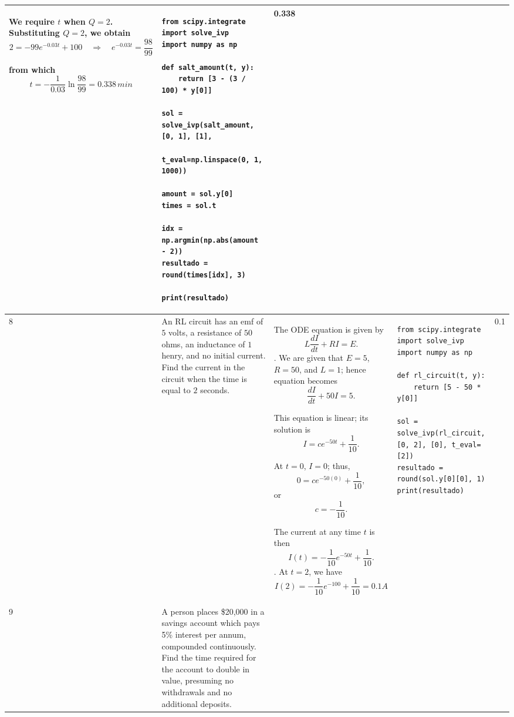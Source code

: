 \documentclass[a4paper,12pt]{article}
\begin{document}
\begin{longtable}{|p{0.3cm}|p{}|p{10cm}|p{}|p{1.5cm}|}
We require \( t \) when \( Q = 2 \). Substituting \( Q = 2 \), we obtain  
\[
2 = -99e^{-0.03t} + 100 \quad  \Rightarrow \quad e^{-0.03t} = \frac{98}{99}
\]

from which  
\[
t = -\frac{1}{0.03} \ln \frac{98}{99} = 0.338 \, min
\]
            &\begin{verbatim}from scipy.integrate import solve_ivp
import numpy as np

def salt_amount(t, y):
    return [3 - (3 / 100) * y[0]]

sol = solve_ivp(salt_amount, [0, 1], [1],
                t_eval=np.linspace(0, 1, 1000))

amount = sol.y[0]
times = sol.t

idx = np.argmin(np.abs(amount - 2))
resultado = round(times[idx], 3)

print(resultado)\end{verbatim}& 0.338                 \\ \hline
    8              & An RL circuit has an emf of $5$ volts, a resistance of $50$ ohms, an inductance of $1$ henry, and no initial
current. Find the current in the circuit when the time is equal to $2$ seconds.
          & The ODE equation is given by \[
L\frac{dI}{dt} + R I =E. 
\]. We are given that  $E = 5$, $R = 50$, and $L = 1$; hence equation  becomes
\[
\frac{dI}{dt} + 50 I = 5.
\]

This equation is linear; its solution is
\[
I = c e^{-50t} + \frac{1}{10}.
\]

At $t = 0$, $I = 0$; thus,
\[
0 = c e^{-50(0)} + \frac{1}{10},
\]
or
\[
c = -\frac{1}{10}.
\]

The current at any time $t$ is then
\[
I(t) = -\frac{1}{10} e^{-50t} + \frac{1}{10}.
\]. At $t=2$, we have \[I(2) = -\frac{1}{10} e^{-100} + \frac{1}{10} =0.1 A
\]
              &
\begin{verbatim}
from scipy.integrate import solve_ivp
import numpy as np

def rl_circuit(t, y):
    return [5 - 50 * y[0]]

sol = solve_ivp(rl_circuit, [0, 2], [0], t_eval=[2])
resultado = round(sol.y[0][0], 1)
print(resultado)
\end{verbatim}&  0.1                \\ \hline
      9           & 
A person places \$20,000 in a savings account which pays 5\% interest per annum, compounded continuously. Find the time required for the account to double in value, presuming no withdrawals and no additional deposits.
                &


\end{longtable}
\end{document}
